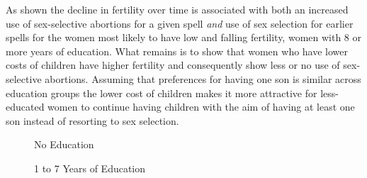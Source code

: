 \documentclass[12pt,letterpaper]{article}
\begin{document}
As shown the decline in fertility over time is associated with both an increased use 
of sex-selective abortions for a given spell \emph{and} use of sex selection for 
earlier spells for the women most likely to have low and falling fertility, women
with 8 or more years of education.
What remains is to show that women who have lower costs of children have higher
fertility and consequently show less or no use of sex-selective abortions. 
Assuming that preferences for having one son is similar across education groups
the lower cost of children makes it more attractive for less-educated women to continue
having children with the aim of having at least one son instead of resorting to
sex selection.


\begin{figure}[htpb]
\centering
\caption*{No Education}
\setcounter{subfigure}{-2}
\setcounter{subfigure}{-1}
\setcounter{subfigure}{0}
\caption*{1 to 7 Years of Education}

\end{figure}
\end{document}
